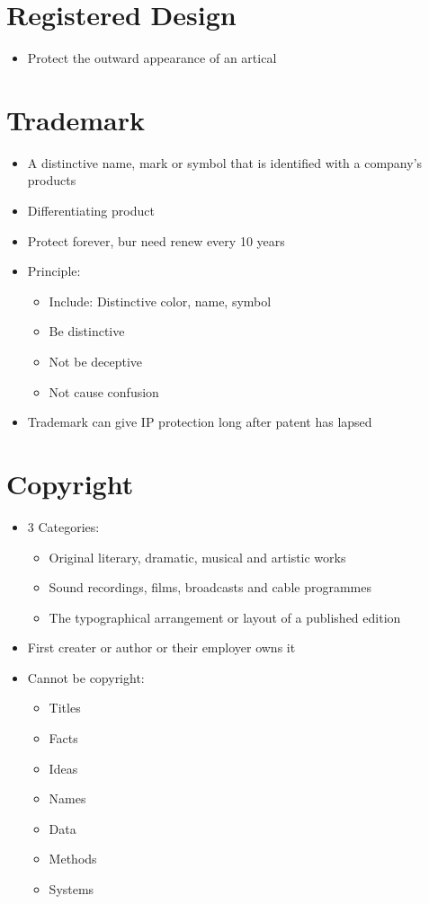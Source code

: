 \documentclass[openany,12pt,a4paper]{book}
\begin{document}
\section{Registered Design}
\begin{itemize}
    \item Protect the outward appearance of an artical
\end{itemize}
\section{Trademark}
\begin{itemize}
    \item A distinctive name, mark or symbol that is identified with a company's products
    \item Differentiating product
    \item Protect forever, bur need renew every 10 years
    \item Principle:
    \begin{itemize}
        \item Include: Distinctive color, name, symbol
        \item Be distinctive
        \item Not be deceptive
        \item Not cause confusion
    \end{itemize}
    \item Trademark can give IP protection long after patent has lapsed
\end{itemize}
\section{Copyright}
\begin{itemize}
    \item 3 Categories:
    \begin{itemize}
        \item Original literary, dramatic, musical and artistic works
        \item Sound recordings, films, broadcasts and cable programmes
        \item The typographical arrangement or layout of a published edition
    \end{itemize}
    \item First creater or author or their employer owns it
    \item Cannot be copyright:
    \begin{itemize}
        \item Titles
        \item Facts
        \item Ideas
        \item Names
        \item Data
        \item Methods
        \item Systems
    \end{itemize}
\end{itemize}
\end{document}
